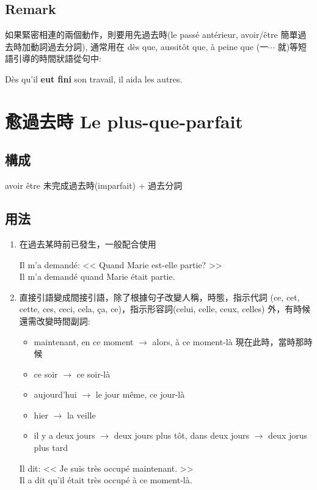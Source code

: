 \documentclass{book}
\begin{document}
        \subsection{Remark}
            如果緊密相連的兩個動作，則要用先過去時(le passé antérieur, avoir/être 簡單過去時加動詞過去分詞), 通常用在 dès que, aussitôt que, à peine que (一$\cdots$ 就)等短語引導的時間狀語從句中:
            \begin{center}
                Dès qu'il \textbf{eut fini} son travail, il aida les autres. 
            \end{center}

    \section{愈過去時 Le plus-que-parfait}

        \subsection{構成}
            avoir être 未完成過去時(imparfait) + 過去分詞

        \subsection{用法}
            \begin{enumerate}
                \item 在過去某時前已發生，一般配合使用
                    \begin{center}
                        Il m'a demandé: << Quand Marie est-elle partie? >> \\
                        Il m'a demandé quand Marie était partie.
                    \end{center}
                \item 直接引語變成間接引語，除了根據句子改變人稱，時態，指示代詞 (ce, cet, cette, ces, ceci, cela, ça, ce)，指示形容詞(celui, celle, ceux, celles) 外，有時候還需改變時間副詞:
                    \begin{itemize}
                        \item maintenant, en ce moment $\to$ alors, à ce moment-là 現在此時，當時那時候
                        \item ce soir $\to$ ce soir-là
                        \item aujourd'hui $\to$ le jour même, ce jour-là
                        \item hier $\to$ la veille
                        \item il y a deux jours $\to$ deux jours plus tôt, dans deux jours $\to$ deux jorus plus tard
                    \end{itemize}
                    \begin{center}
                        Il dit: << Je suis très occupé maintenant. >> 
                        \\
                        Il a dit qu'il était très occupé à ce moment-là.
                    \end{center}
                    
            \end{enumerate}
\end{document}
